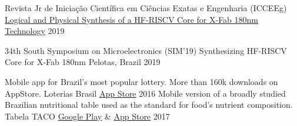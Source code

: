 
\begin{cventries}


    \cvcompactentry
    { Revista Jr de Iniciação Científica em Ciências Exatas e Engenharia (ICCEEg)}
    {\href{http://download.c3.furg.br/components/download_categoria/baixar.php?arquivo=e4873aa9a05cc5ed839561d121516766}{Logical and Physical Synthesis of a HF-RISCV Core for X-Fab 180nm Technology}}
    {}
    {2019}

  \cvcompactentry
    {34th South Symposium on Microelectronics (SIM'19)}
    {Synthesizing HF-RISCV Core for X-Fab 180nm}
    {Pelotas, Brazil}
    {2019}
\end{cventries}


\begin{cventries}

  \cvcompactentry
    {Mobile app for Brazil’s most popular lottery. More than 160k downloads on AppStore.}
    {Loterias Brasil}
    {\href{https://apps.apple.com/app/id992505562}{App Store}}
    {2016}
  \cvcompactentry
    {Mobile version of a broadly studied Brazilian nutritional table used as the standard for food’s nutrient composition.}
    {Tabela TACO}
    {\href{https://play.google.com/store/apps/details?id=rodrigo.TabelaTaco&hl=pt_BR&gl=US}{Google Play} \& \href{https://apps.apple.com/app/id1066079092}{App Store} }
    {2017}

\end{cventries}
